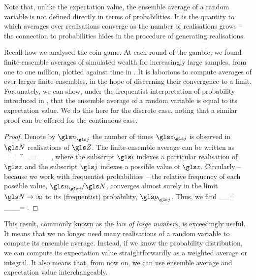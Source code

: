 Note that, unlike the expectation value, the ensemble average of a random variable is not defined directly 
in terms of probabilities. It is the quantity to which averages over realisations converge as the number of 
realisations grows -- the connection to probabilities hides in the procedure of generating realisations. 

Recall how we analysed the coin game. At each round of the gamble, we found finite-ensemble averages of 
simulated wealth for increasingly large samples, from one to one million, plotted against time in .
It is laborious to compute averages of ever larger finite ensembles, in the hope of discerning their 
convergence to a limit. Fortunately, we can show, under the frequentist interpretation of probability 
introduced in , that the ensemble average of a random variable is equal 
to its expectation value. We do this here for the discrete case, noting that a similar proof can be 
offered for the continuous case.
\begin{proof}
Denote by  $\gn_\gj$ the number of times $\z_\gj$ is observed in $\N$ realisations of $\Z$. The finite-ensemble average can be written as
\be
\ave{\Z}_\N =\sum_{}^{\N}  \z_\gi = \sum_\gj \frac{\gn_\gj}{\N} \z_\gj,
\ee
where the subscript $\gi$ indexes a particular realisation of $\z$ and the subscript $\gj$ indexes a possible value of $\z$. 
Circularly -- because we work with frequentist probabilities -- the relative frequency of each possible value, 
$\gn_\gj/\N$, converges almost surely in the limit $\N\to\infty$ to its (frequentist) probability, $\p_\gj$. Thus, we find
\be
\lim_{\N\to\infty}\ave{\Z}_\N = \sum_\gj \p_\gj \z_\gj = \eval{\Z}.
\ee
\end{proof}
This result, commonly known as the \textit{law of large numbers}, is exceedingly useful. It means that we no longer need many realisations of a random variable to compute its ensemble average. Instead, if we know the probability distribution, we can compute its expectation value straightforwardly as a weighted average or integral. It also means that, from now on, we can use ensemble average and expectation value interchangeably.

